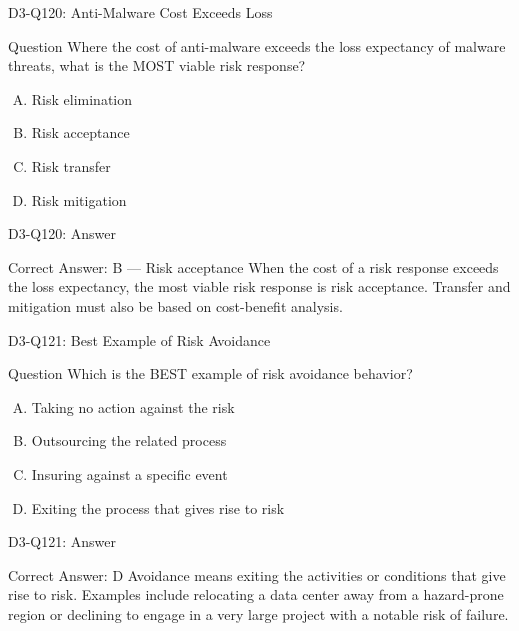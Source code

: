 \documentclass{beamer}
\begin{document}
	\begin{frame}{D3-Q120: Anti-Malware Cost Exceeds Loss}
		\begin{block}{Question}
			Where the cost of anti-malware exceeds the loss expectancy of malware threats, what is the MOST viable risk response?
		\end{block}
		\begin{enumerate}[(A)]
			\item Risk elimination
			\item Risk acceptance
			\item Risk transfer
			\item Risk mitigation
		\end{enumerate}
	\end{frame}
	\begin{frame}{D3-Q120: Answer}
		\begin{block}{Correct Answer: B --- Risk acceptance}
			When the cost of a risk response exceeds the loss expectancy, the most viable risk response is risk acceptance. Transfer and mitigation must also be based on cost-benefit analysis.
		\end{block}
	\end{frame}
	
	\begin{frame}{D3-Q121: Best Example of Risk Avoidance}
		\begin{block}{Question}
			Which is the BEST example of risk avoidance behavior?
		\end{block}
		\begin{enumerate}[(A)]
			\item Taking no action against the risk
			\item Outsourcing the related process
			\item Insuring against a specific event
			\item Exiting the process that gives rise to risk
		\end{enumerate}
	\end{frame}
	\begin{frame}{D3-Q121: Answer}
		\begin{block}{Correct Answer: D}
			Avoidance means exiting the activities or conditions that give rise to risk. Examples include relocating a data center away from a hazard-prone region or declining to engage in a very large project with a notable risk of failure.
		\end{block}
	\end{frame}
	
\end{document}
